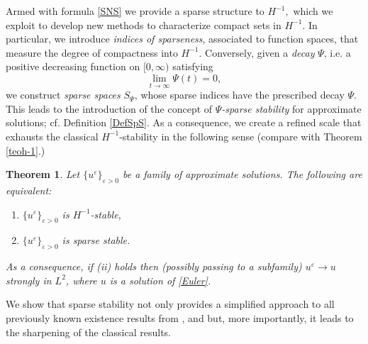 \documentclass[11pt, a4paper,leqno]{amsart}
\newtheorem{theorem}{Theorem}
\theoremstyle{plain}
\numberwithin{equation}{section}
\theoremstyle{definition}
\theoremstyle{remark}
\begin{document}
Armed with formula \eqref{SNS} we provide a sparse structure to $H^{-1},$ which we
exploit to develop new methods to characterize  compact sets 
in $H^{-1}.$ In particular, we introduce \emph{indices of sparseness}, associated to function spaces, that measure the degree of compactness  into
$H^{-1}$. Conversely, given a
\emph{decay} $\Psi$, i.e. a positive decreasing function on $[0, \infty)$ satisfying
\begin{equation}
\lim_{t\rightarrow\infty}\Psi(t)=0,\label{psi1}%
\end{equation}
 we
construct \emph{sparse spaces} $S_{\Psi}$, whose sparse indices have the prescribed decay $\Psi$. This leads to the introduction of the concept of \emph{$\Psi$-sparse stability} for approximate solutions; cf. Definition \ref{DefSpS}. 
As a consequence, we create a refined scale that exhausts the classical $H^{-1}$-stability in the following sense (compare with Theorem \ref{teoh-1}.)




\begin{theorem}
\label{teo:exhaust} Let $\{u^{\varepsilon
}\}_{\varepsilon>0}$ be a family of approximate solutions. The
following are equivalent:
\begin{enumerate}
\item[(i)] $\{u^{\varepsilon}\}_{\varepsilon>0}$ is $H^{-1}$-stable,
\item[(ii)] $\{u^\varepsilon\}_{\varepsilon > 0}$ is sparse stable.
\end{enumerate}
As a consequence, if \emph{(ii)} holds then (possibly passing to a subfamily) $u^\varepsilon \to u$ strongly in $L^2$, where $u$ is a solution of \eqref{Euler}. 
\end{theorem}

We show that sparse stability not only provides a simplified approach to all previously known existence results from  \cite{DiPernaMajda}, \cite{LNT} and \cite{Tadmor} but, more importantly, it leads to the sharpening of the classical results.

  
\end{document}
